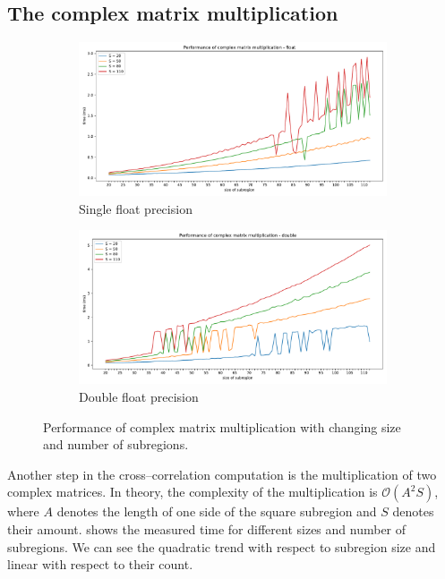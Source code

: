 \subsection{The complex matrix multiplication}
\begin{figure}
	\begin{subfigure}{\textwidth}
		\centering
		\includegraphics[width=\linewidth]{img/eval/multiply-plot-float}
		\caption{Single float precision}
		\label{multiply-plot:float}
	\end{subfigure}%

	\begin{subfigure}{\textwidth}
		\centering
		\includegraphics[width=\linewidth]{img/eval/multiply-plot-double}
		\caption{Double float precision}
		\label{multiply-plot:double}
	\end{subfigure}
	\caption{Performance of complex matrix multiplication with changing size and number of subregions.}
	\label{multiply-plot}
\end{figure}

Another step in the cross--correlation computation is the multiplication of two complex matrices. In theory, the complexity of the multiplication is $\mathcal{O}(A^2S)$, where $A$ denotes the length of one side of the square subregion and $S$ denotes their amount.  shows the measured time for different sizes and number of subregions. We can see the quadratic trend with respect to subregion size and linear with respect to their count.


